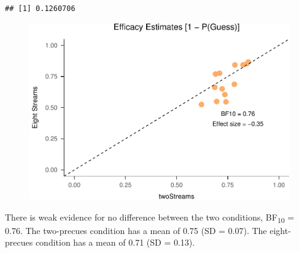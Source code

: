 \documentclass[,man]{apa6}
\theoremstyle{definition}
\theoremstyle{definition}
\theoremstyle{definition}
\theoremstyle{remark}
\begin{document}
\begin{verbatim}
## [1] 0.1260706
\end{verbatim}

\begin{figure}
\centering
\includegraphics{nStreams_Bayesian_files/figure-latex/unnamed-chunk-10-1.pdf}
\caption{}
\end{figure}

There is weak evidence for no difference between the two conditions,
BF\textsubscript{10} = 0.76. The two-precues condition has a mean of
0.75 (SD = 0.07). The eight-precues condition has a mean of 0.71 (SD =
0.13).
\end{document}
